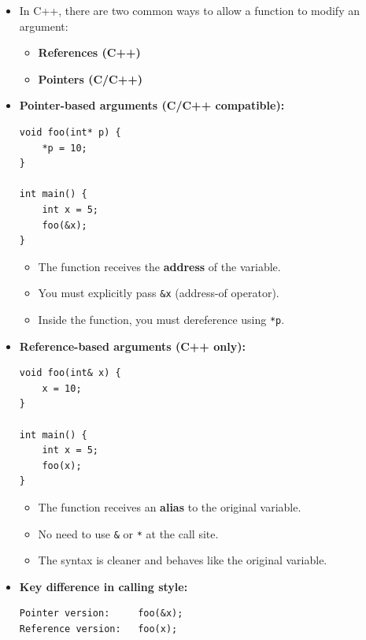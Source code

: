 \documentclass[10pt]{article}
\newcommand{\pbreak}{\vspace{30pt}}
\begin{document}
\begin{itemize}

\item In C++, there are two common ways to allow a function to modify an argument:
\begin{itemize}
    \item \textbf{References (C++)}
    \item \textbf{Pointers (C/C++)}
\end{itemize}

\pbreak

\item \textbf{Pointer-based arguments (C/C++ compatible):}
\begin{verbatim}
void foo(int* p) {
    *p = 10;
}

int main() {
    int x = 5;
    foo(&x);
}
\end{verbatim}

\begin{itemize}
    \item The function receives the \textbf{address} of the variable.
    \item You must explicitly pass \verb|&x| (address-of operator).
    \item Inside the function, you must dereference using \verb|*p|.
\end{itemize}

\pbreak

\item \textbf{Reference-based arguments (C++ only):}
\begin{verbatim}
void foo(int& x) {
    x = 10;
}

int main() {
    int x = 5;
    foo(x);
}
\end{verbatim}

\begin{itemize}
    \item The function receives an \textbf{alias} to the original variable.
    \item No need to use \verb|&| or \verb|*| at the call site.
    \item The syntax is cleaner and behaves like the original variable.
\end{itemize}

\pbreak

\item \textbf{Key difference in calling style:}

\begin{verbatim}
Pointer version:     foo(&x);
Reference version:   foo(x);
\end{verbatim}


\end{itemize}
\end{document}
